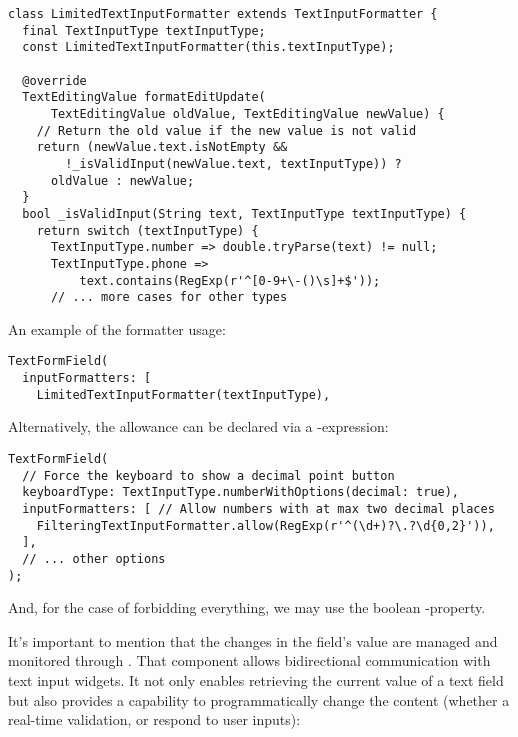 \begin{lstlisting}
class LimitedTextInputFormatter extends TextInputFormatter {
  final TextInputType textInputType;
  const LimitedTextInputFormatter(this.textInputType);

  @override
  TextEditingValue formatEditUpdate(
      TextEditingValue oldValue, TextEditingValue newValue) {
    // Return the old value if the new value is not valid
    return (newValue.text.isNotEmpty &&
        !_isValidInput(newValue.text, textInputType)) ?
      oldValue : newValue;
  }
  bool _isValidInput(String text, TextInputType textInputType) {
    return switch (textInputType) {
      TextInputType.number => double.tryParse(text) != null;
      TextInputType.phone => 
          text.contains(RegExp(r'^[0-9+\-()\s]+$'));
      // ... more cases for other types
\end{lstlisting}

\noindent An example of the formatter usage:

\begin{lstlisting}
TextFormField(
  inputFormatters: [
    LimitedTextInputFormatter(textInputType),
\end{lstlisting}

\noindent Alternatively, the allowance can be declared via a -expression:

\begin{lstlisting}
TextFormField(
  // Force the keyboard to show a decimal point button
  keyboardType: TextInputType.numberWithOptions(decimal: true),
  inputFormatters: [ // Allow numbers with at max two decimal places
    FilteringTextInputFormatter.allow(RegExp(r'^(\d+)?\.?\d{0,2}')),
  ],
  // ... other options
);
\end{lstlisting}

\noindent And, for the case of forbidding everything, we may use the boolean -property. 

It's important to mention that the changes in the field's value are managed and monitored through . 
That component allows bidirectional communication with text input widgets. It not only enables retrieving the current 
value of a text field but also provides a capability to programmatically change the content (whether a real-time 
validation, or respond to user inputs):

